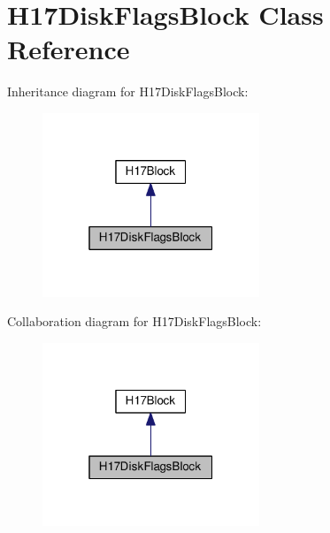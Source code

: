 \hypertarget{classH17DiskFlagsBlock}{}\section{H17\+Disk\+Flags\+Block Class Reference}
\label{classH17DiskFlagsBlock}


Inheritance diagram for H17\+Disk\+Flags\+Block\+:\nopagebreak
\begin{figure}[H]
\begin{center}
\leavevmode
\includegraphics[width=184pt]{classH17DiskFlagsBlock__inherit__graph}
\end{center}
\end{figure}


Collaboration diagram for H17\+Disk\+Flags\+Block\+:\nopagebreak
\begin{figure}[H]
\begin{center}
\leavevmode
\includegraphics[width=184pt]{classH17DiskFlagsBlock__coll__graph}
\end{center}
\end{figure}
